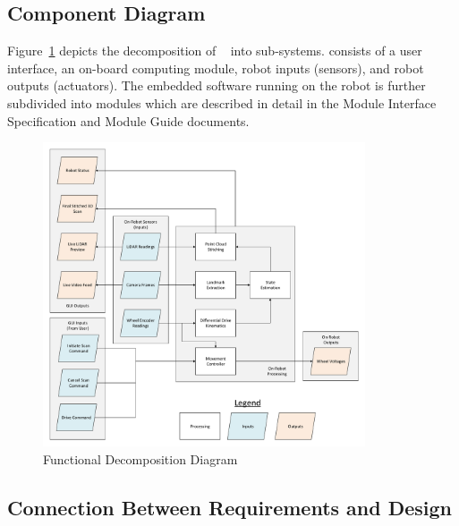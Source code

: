 \documentclass[12pt, titlepage]{article}
\begin{document}
\subsection{Component Diagram}

Figure~\ref{Fig_FunctionalDecomposition} depicts the decomposition of \progname~ into sub-systems. \progname consists of a user interface, an on-board computing module, robot inputs (sensors), and robot outputs (actuators). The embedded software running on the robot is further subdivided into modules which are described in detail in the Module Interface Specification and Module Guide documents.
 
\begin{figure}[H]
\begin{center}
    \includegraphics[width=0.85\textwidth]{Figures/Functional Decomposition.pdf}
\caption{Functional Decomposition Diagram}
\label{Fig_FunctionalDecomposition} 
\end{center}
\end{figure}

\subsection{Connection Between Requirements and Design} \label{sec_Connection}

  
\end{document}
